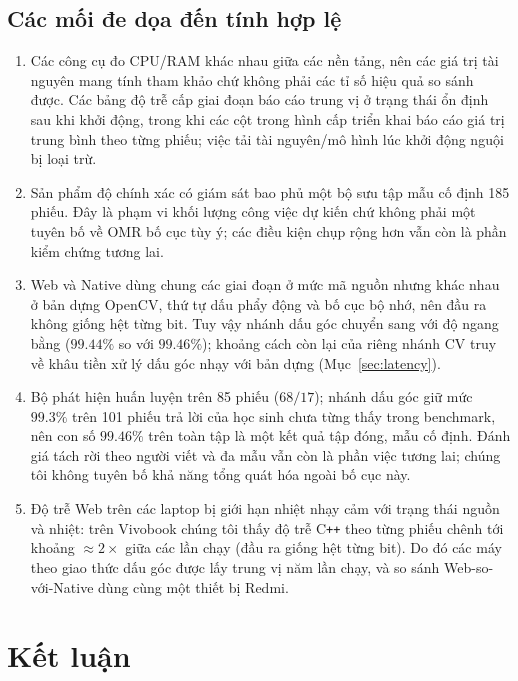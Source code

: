 \documentclass[conference]{IEEEtran}
\begin{document}
\subsection{Các mối đe dọa đến tính hợp lệ}
\label{sec:threats}
\begin{enumerate}[label=(\roman*), leftmargin=*, itemsep=1pt, topsep=2pt]
  \item Các công cụ đo CPU/RAM khác nhau giữa các nền tảng, nên các giá trị tài
nguyên mang tính tham khảo chứ không phải các tỉ số hiệu quả so sánh được. Các
bảng độ trễ cấp giai đoạn báo cáo trung vị ở trạng thái ổn định sau khi khởi
động, trong khi các cột trong hình cấp triển khai báo cáo giá trị trung bình theo
từng phiếu; việc tải tài nguyên/mô hình lúc khởi động nguội bị loại trừ.
  \item Sản phẩm độ chính xác có giám sát bao phủ một bộ sưu tập mẫu cố định 185
  phiếu. Đây là phạm vi khối lượng công việc dự kiến chứ không phải một tuyên bố
  về OMR bố cục tùy ý; các điều kiện chụp rộng hơn vẫn còn là phần kiểm chứng
  tương lai.
  \item Web và Native dùng chung các giai đoạn ở mức mã nguồn nhưng khác nhau ở
  bản dựng OpenCV, thứ tự dấu phẩy động và bố cục bộ nhớ, nên đầu ra không giống
  hệt từng bit. Tuy vậy nhánh dấu góc chuyển sang với độ ngang bằng ($99.44\%$ so
  với $99.46\%$); khoảng cách còn lại của riêng nhánh CV truy về khâu tiền xử lý
  dấu góc nhạy với bản dựng (Mục~\ref{sec:latency}).
  \item Bộ phát hiện huấn luyện trên 85 phiếu ($68/17$); nhánh dấu góc giữ mức
  $99.3\%$ trên 101 phiếu trả lời của học sinh chưa từng thấy trong benchmark, nên
  con số $99.46\%$ trên toàn tập là một kết quả tập đóng, mẫu cố định. Đánh giá
  tách rời theo người viết và đa mẫu vẫn còn là phần việc tương lai; chúng tôi
  không tuyên bố khả năng tổng quát hóa ngoài bố cục này.
  \item Độ trễ Web trên các laptop bị giới hạn nhiệt nhạy cảm với trạng thái nguồn
  và nhiệt: trên Vivobook chúng tôi thấy độ trễ C\texttt{++} theo từng phiếu chênh
  tới khoảng $\approx 2\times$ giữa các lần chạy (đầu ra giống hệt từng bit). Do
  đó các máy theo giao thức dấu góc được lấy trung vị năm lần chạy, và so sánh
  Web-so-với-Native dùng cùng một thiết bị Redmi.
\end{enumerate}

\section{Kết luận}
\end{document}
